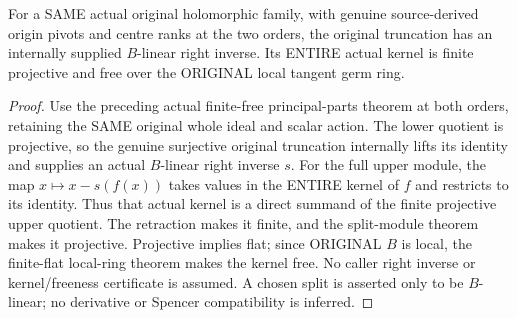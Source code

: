 \begin{theorem}
\label{hir:actual-centre-principal-parts-whole-split-kernel}
For a SAME actual original holomorphic family, with genuine source-derived
origin pivots and centre ranks at the two orders, the original truncation
has an internally supplied $B$-linear right inverse. Its ENTIRE actual
kernel is finite projective and free over the ORIGINAL local tangent
germ ring.
\leanok
\end{theorem}
\begin{proof}
Use the preceding actual finite-free principal-parts theorem at both
orders, retaining the SAME original whole ideal and scalar action.
The lower quotient is projective, so the genuine surjective original
truncation internally lifts its identity and supplies an actual
$B$-linear right inverse $s$. For the full upper module, the map
$x\mapsto x-s(f(x))$ takes values in the ENTIRE kernel of $f$ and
restricts to its identity. Thus that actual kernel is a direct summand
of the finite projective upper quotient. The retraction makes it finite,
and the split-module theorem makes it projective. Projective implies
flat; since ORIGINAL $B$ is local, the finite-flat local-ring theorem
makes the kernel free. No caller right inverse or kernel/freeness
certificate is assumed. A chosen split is asserted only to be $B$-linear;
no derivative or Spencer compatibility is inferred.
\end{proof}

